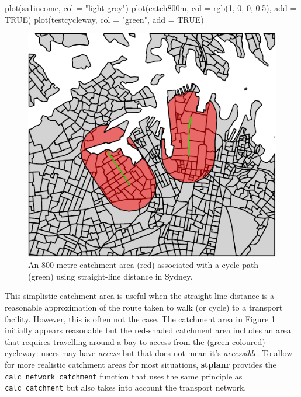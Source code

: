 \begin{Schunk}
\begin{Sinput}
plot(sa1income, col = "light grey")
plot(catch800m, col = rgb(1, 0, 0, 0.5), add = TRUE)
plot(testcycleway, col = "green", add = TRUE)
\end{Sinput}
\begin{figure}
\includegraphics{catchmentplot-1} \caption[An 800 metre catchment area (red) associated with a cycle path (green) using straight-line distance in Sydney]{An 800 metre catchment area (red) associated with a cycle path (green) using straight-line distance in Sydney.}\label{fig:catchmentplot}
\end{figure}
\end{Schunk}

This simplistic catchment area is useful when the straight-line distance
is a reasonable approximation of the route taken to walk (or cycle) to a
transport facility. However, this is often not the case. The catchment
area in Figure \ref{fig:catchmentplot} initially appears reasonable but
the red-shaded catchment area includes an area that requires travelling
around a bay to access from the (green-coloured) cycleway:
users may have \emph{access} but that does not mean it's \emph{accessible}. To allow for
more realistic catchment areas for most situations, \textbf{stplanr}
provides the \texttt{calc\_network\_catchment} function that uses the
same principle as \texttt{calc\_catchment} but also takes into account
the transport network.

